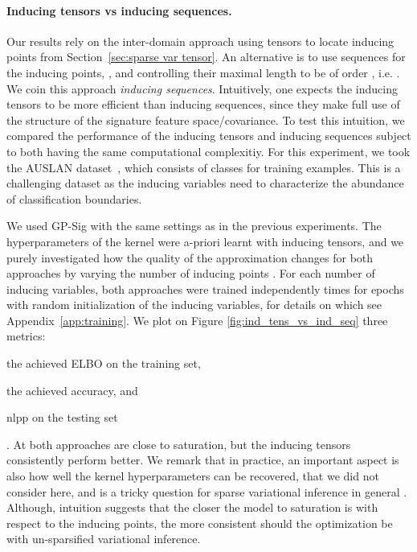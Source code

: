 \documentclass{article}
\begin{document}
\paragraph{Inducing tensors vs inducing sequences.} Our results rely on the inter-domain approach using tensors to locate inducing points from Section~\ref{sec:sparse var tensor}. An alternative is to use sequences for the inducing points, , and controlling their maximal length  to be of order , i.e. .
We coin this approach \textit{inducing sequences}.
Intuitively, one expects the inducing tensors to be more efficient than inducing sequences, since they make full use of the structure of the signature feature space/covariance.
To test this intuition, we compared the performance of the inducing tensors and inducing sequences subject to both having the same computational complexitiy.
For this experiment, we took the AUSLAN dataset~\cite{Dua2017UCI}, which consists of  classes for  training examples.
This is a challenging dataset as the inducing variables need to characterize the abundance of classification boundaries.

We used GP-Sig with the same settings as in the previous experiments.
The hyperparameters of the kernel were a-priori learnt with  inducing tensors, and we purely investigated how the quality of the approximation changes for both approaches by varying the number of inducing points .
For each number of inducing variables, both approaches were trained independently  times for  epochs with random initialization of the inducing variables, for details on which see Appendix~\ref{app:training}.
We plot on Figure \ref{fig:ind_tens_vs_ind_seq} three metrics: \begin{enumerate*}[label=(\arabic*)] \item the achieved ELBO on the training set, \item the achieved accuracy, and \item nlpp on the testing set \end{enumerate*}.
At  both approaches are close to saturation, but the inducing tensors consistently perform better.
We remark that in practice, an important aspect is also how well the kernel hyperparameters can be recovered, that we did not consider here, and is a tricky question for sparse variational inference in general \cite{bauer2016understanding}.
Although, intuition suggests that the closer the model to saturation is with respect to the inducing points, the more consistent should the optimization be with un-sparsified variational inference.
\end{document}
